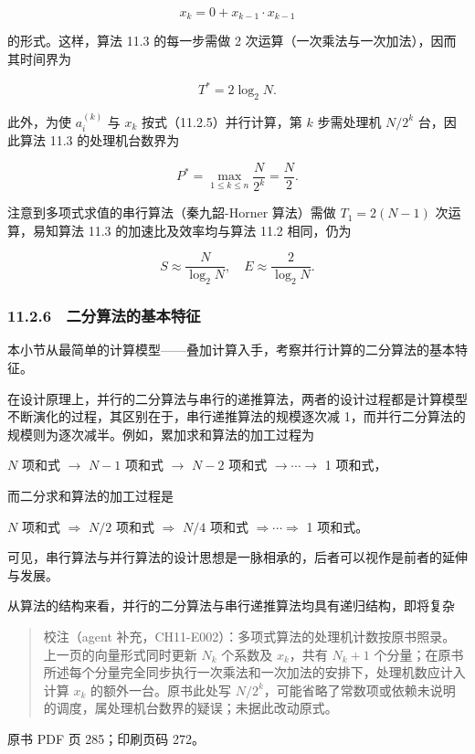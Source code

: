 \[
x_k=0+x_{k-1}\cdot x_{k-1}
\]

的形式。这样，算法 11.3 的每一步需做 2 次运算（一次乘法与一次加法），因而其时间界为

\[
T^*=2\log_2 N.
\]

此外，为使 \(a_i^{(k)}\) 与 \(x_k\) 按式（11.2.5）并行计算，第 \(k\) 步需处理机 \(N/2^k\) 台，因此算法 11.3 的处理机台数界为

\[
P^*=\max_{1\le k\le n}\frac{N}{2^k}=\frac{N}{2}.
\]

注意到多项式求值的串行算法（秦九韶-Horner 算法）需做 \(T_1=2(N-1)\) 次运算，易知算法 11.3 的加速比及效率均与算法 11.2 相同，仍为

\[
S\approx\frac{N}{\log_2 N},\quad E\approx\frac{2}{\log_2 N}.
\]

\subsubsection{11.2.6　二分算法的基本特征}\label{ch11-ux4e8cux5206ux7b97ux6cd5ux7684ux57faux672cux7279ux5f81}

本小节从最简单的计算模型------叠加计算入手，考察并行计算的二分算法的基本特征。

在设计原理上，并行的二分算法与串行的递推算法，两者的设计过程都是计算模型不断演化的过程，其区别在于，串行递推算法的规模逐次减 1，而并行二分算法的规模则为逐次减半。例如，累加求和算法的加工过程为

\(N\) 项和式 \(\to\) \(N-1\) 项和式 \(\to\) \(N-2\) 项和式 \(\to\cdots\to\) 1 项和式，

而二分求和算法的加工过程是

\(N\) 项和式 \(\Rightarrow\) \(N/2\) 项和式 \(\Rightarrow\) \(N/4\) 项和式 \(\Rightarrow\cdots\Rightarrow\) 1 项和式。

可见，串行算法与并行算法的设计思想是一脉相承的，后者可以视作是前者的延伸与发展。

从算法的结构来看，并行的二分算法与串行递推算法均具有递归结构，即将复杂

\begin{quote}
校注（agent 补充，CH11-E002）：多项式算法的处理机计数按原书照录。上一页的向量形式同时更新 \(N_k\) 个系数及 \(x_k\)，共有 \(N_k+1\) 个分量；在原书所述每个分量完全同步执行一次乘法和一次加法的安排下，处理机数应计入计算 \(x_k\) 的额外一台。原书此处写 \(N/2^k\)，可能省略了常数项或依赖未说明的调度，属处理机台数界的疑误；未据此改动原式。
\end{quote}

\clearpage

原书 PDF 页 285；印刷页码 272。

